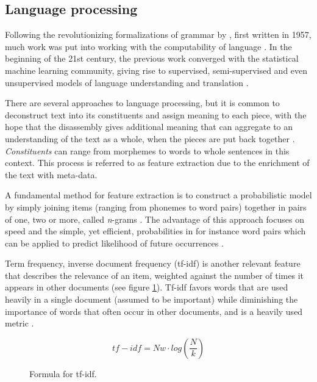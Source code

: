 \documentclass[a4paper]{article}
\begin{document}
\subsection{Language processing}
Following the revolutionizing formalizations of grammar by \cite{Chomsky2002},
first written in 1957, much work was put into working with the computability
of language \citep{Jurafsky2000}. In the beginning of the 21st century,
the previous work converged with the statistical machine learning community,
giving rise to supervised, semi-supervised and even unsupervised models
of language understanding and translation \citep{Jurafsky2000}.

There are several approaches to language processing, but it is common
to deconstruct text into its constituents and assign meaning
to each piece, with the hope that the disassembly gives additional meaning
that can aggregate to an understanding of the text as a whole, when the pieces
are put back together \citep{Jurafsky2000}.
\textit{Constituents} can range from morphemes to words to whole sentences in
this context. This process is referred to as feature extraction due to the
enrichment of the text with meta-data.

A fundamental method for feature extraction is to construct a probabilistic
model by simply joining items (ranging from phonemes to word pairs) together
in pairs of one, two or more, called \textit{n}-grams \citep{Jurafsky2000}.
The advantage of this approach focuses on speed and the simple, yet efficient,
probabilities in for instance word pairs which can be applied to predict
likelihood of future occurrences \citep{Jurafsky2000}.

Term frequency, inverse document frequency (tf-idf) is another relevant feature
that describes the relevance of an item, weighted against the number of
times it appears in other documents \citep{Jurafsky2000} (see figure \ref{fig:tfidf}).
Tf-idf favors words that are used heavily in a
single document (assumed to be important) while diminishing the importance of
words that often occur in other documents, and is a heavily used metric \citep{Jurafsky2000}.

\begin{figure}
\[tf-idf = Nw \cdot log(\frac{N}{k})\]
\caption{Formula for tf-idf.}
\label{fig:tfidf}
\end{figure}
\end{document}
